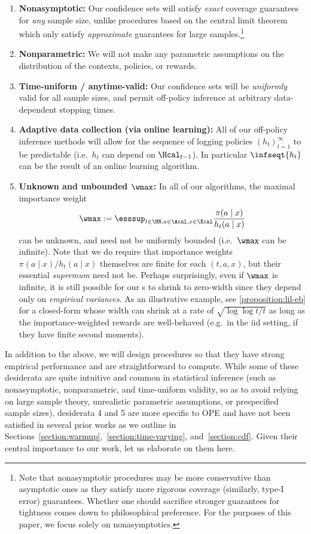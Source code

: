 \begin{enumerate}
\item \textbf{Nonasymptotic:} Our confidence sets will satisfy \emph{exact} coverage guarantees for \emph{any} sample size, unlike procedures based on the central limit theorem which only satisfy \emph{approximate} guarantees for large samples.\footnote{Note that nonasymptotic procedures may be more conservative than asymptotic ones as they satisfy more rigorous coverage (similarly, type-I error) guarantees. Whether one should sacrifice stronger guarantees for tightness comes down to philosophical preference. For the purposes of this paper, we focus solely on nonasymptotics.}
\item \textbf{Nonparametric:} We will not make any parametric assumptions on the distribution of the contexts, policies, or rewards.
\item \textbf{Time-uniform / anytime-valid:} Our confidence sets will be \emph{uniformly} valid for all sample sizes, and permit off-policy inference at arbitrary data-dependent stopping times.
\item \textbf{Adaptive data collection (via online learning):} All of our off-policy inference methods will allow for the sequence of logging policies $(h_t)_{t=1}^\infty$ to be predictable (i.e.~$h_t$ can depend on $\Hcal_{t-1}$). In particular $\infseqt {h_t}$ can be the result of an online learning algorithm.
\item \textbf{Unknown and unbounded $\wmax$:} In all of our algorithms, the maximal importance weight
  \[\wmax := \esssup_{t\in \NN, a \in \Acal, x \in \Xcal} \frac{\pi(a \mid x)}{h_t(a \mid x)} \]
  can be unknown, and need not be uniformly bounded (i.e.~$\wmax$ can be infinite). Note that we do require that importance weights $\pi(a\mid x) / h_t(a \mid x)$ themselves are finite for each $(t, a, x)$, but their essential \emph{supremum} need not be. Perhaps surprisingly, even if $\wmax$ is infinite, it is still possible for our \cs{}s to shrink to zero-width since they depend only on \emph{empirical variances}. As an illustrative example, see \cref{proposition:lil-eb} for a closed-form \cs{} whose width can shrink at a rate of $\sqrt{\log\log t / t}$ as long as the importance-weighted rewards are well-behaved (e.g.~in the iid setting, if they have finite second moments).
\end{enumerate}
In addition to the above, we will design procedures so that they have strong empirical performance and are straightforward to compute. While some of these desiderata are quite intuitive and common in statistical inference (such as nonasymptotic, nonparametric, and time-uniform validity, so as to avoid relying on large sample theory, unrealistic parametric assumptions, or prespecified sample sizes), desiderata 4 and 5 are more specific to OPE and have not been satisfied in several prior works as we outline in Sections~\ref{section:warmup},~\ref{section:time-varying}, and~\ref{section:cdf}. Given their central importance to our work, let us elaborate on them here.

